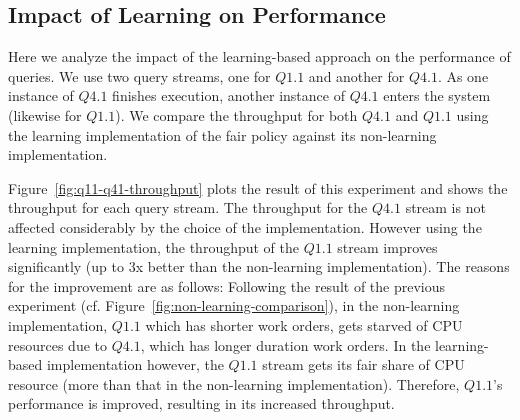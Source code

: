 \subsection{Impact of Learning on Performance}\label{ssec:learning-impact-perf}
Here we analyze the impact of the learning-based approach on the performance of queries. 
We use two query streams, one for $Q1.1$ and another for $Q4.1$.
As one instance of $Q4.1$ finishes execution, another instance of $Q4.1$ enters the system (likewise for $Q1.1$).
We compare the throughput for both $Q4.1$ and $Q1.1$ using the learning implementation of the fair policy against its non-learning implementation.



Figure~\ref{fig:q11-q41-throughput} plots the result of this experiment and shows the throughput for each query stream. 
The throughput for the $Q4.1$ stream is not affected considerably by the choice of the implementation. 
However using the learning implementation, the throughput of the $Q1.1$ stream improves significantly (up to 3x better than the non-learning implementation). 
The reasons for the improvement are as follows:
Following the result of the previous experiment (cf. Figure~\ref{fig:non-learning-comparison}), in the non-learning implementation, $Q1.1$ which has shorter work orders, gets starved of CPU resources due to $Q4.1$, which has longer duration work orders. 
In the learning-based implementation however, the $Q1.1$ stream gets its fair share of CPU resource (more than that in the non-learning implementation). 
Therefore, $Q1.1$'s performance is improved, resulting in its increased throughput. 

